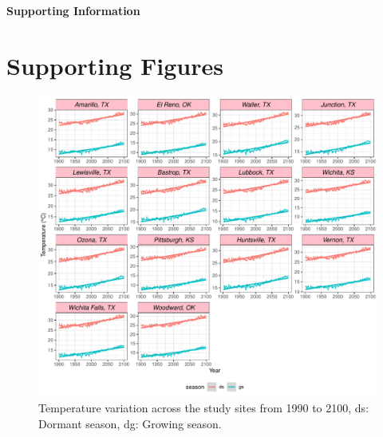 \documentclass[12pt]{article}\usepackage[]{graphicx}\usepackage[dvipsnames]{xcolor}
\begin{document}
\newpage


\newpage
\clearpage 
\setcounter{equation}{0}
\setcounter{figure}{0}
\setcounter{section}{0}
\setcounter{table}{0}
\renewcommand{\theequation}{S.\arabic{equation}}
\renewcommand{\thetable}{S-\arabic{table}}
\renewcommand{\thefigure}{S-\arabic{figure}}
\renewcommand{\thesection}{S.\arabic{section}}

\centerline{\Large{\textbf{Supporting Information}}}

\section {Supporting Figures}

\begin{figure}[H]
		\centering
		\includegraphics[width=0.95\linewidth]{Figures/fig_tas_past_present_future.pdf}
		\caption{Temperature variation across the study sites from 1990 to 2100,
		ds: Dormant season, dg: Growing season.}
		\label{Sup:temp_variation}
\end{figure}
\end{document}
